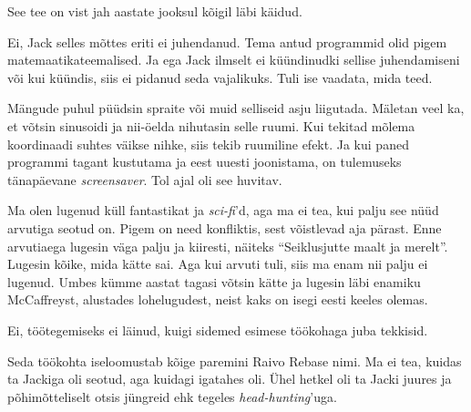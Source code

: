 See tee on vist jah aastate jooksul kõigil läbi käidud. 


Ei, Jack selles mõttes eriti ei juhendanud. Tema antud 
programmid olid pigem matemaatikateemalised. Ja ega Jack ilmselt ei 
küündinudki sellise juhendamiseni või kui küündis, siis
ei pidanud seda vajalikuks. Tuli ise vaadata, mida teed. 

Mängude puhul püüdsin spraite või muid selliseid asju 
liigutada. Mäletan veel ka, et võtsin 
sinusoidi ja nii-öelda nihutasin selle ruumi. Kui tekitad mõlema koordinaadi 
suhtes väikse nihke, siis tekib ruumiline efekt. Ja kui 
paned programmi tagant kustutama ja eest uuesti joonistama, on tulemuseks 
tänapäevane \emph{screensaver}. Tol ajal oli see huvitav.


Ma olen lugenud küll fantastikat ja \emph{sci-fi}'d, aga ma ei 
tea, kui palju see nüüd arvutiga seotud on. Pigem on need
konfliktis, sest võistlevad aja pärast. Enne arvutiaega lugesin 
väga palju ja kiiresti, näiteks \enquote{Seiklusjutte maalt ja merelt}. Lugesin kõike, mida kätte 
sai. Aga kui arvuti tuli, siis ma enam nii palju ei 
lugenud. Umbes kümme aastat tagasi võtsin kätte ja lugesin 
läbi enamiku McCaffreyst, alustades lohelugudest, neist kaks on isegi eesti keeles olemas.


Ei, töötegemiseks ei läinud, kuigi sidemed esimese töökohaga juba tekkisid.


Seda töökohta iseloomustab kõige paremini Raivo Rebase 
nimi. Ma ei tea, kuidas ta Jackiga oli seotud, aga kuidagi igatahes oli. 
Ühel hetkel oli ta Jacki juures ja põhimõtteliselt otsis jüngreid ehk tegeles 
\emph{head-hunting}'uga.

